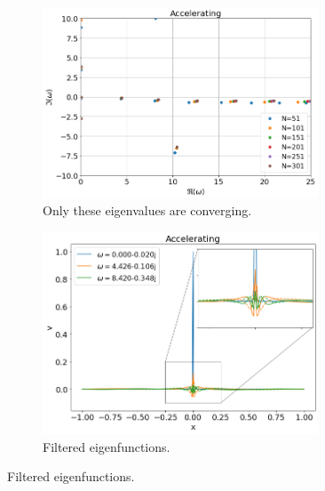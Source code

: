 \documentclass{article}
\begin{document}
\begin{figure}[H]
\begin{subfigure}[b]{0.5\textwidth}
            \includegraphics*[width=0.9\textwidth]{img/eigvals-accelerating-filtered.png}
            \caption{Only these eigenvalues are converging.}
        \end{subfigure}%
        \begin{subfigure}[b]{0.5\textwidth}
            \includegraphics*[width=0.9\textwidth]{img/eigfuncs-accelerating-filtered.png}
            \caption{Filtered eigenfunctions.}
        \end{subfigure}
    \end{figure}
    
\end{document}
